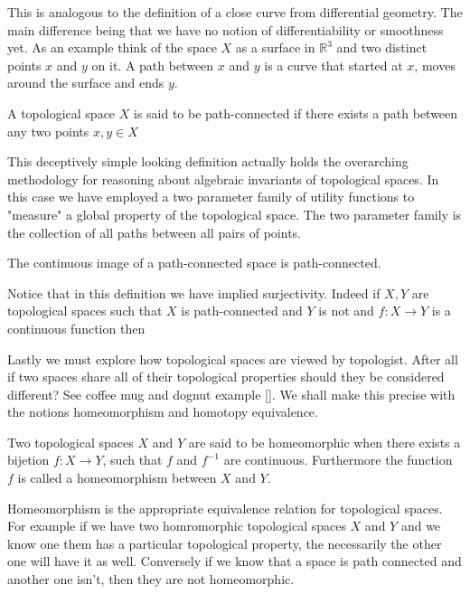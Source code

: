     This is analogous to the definition of a close curve from differential geometry. The main difference being that we have no notion of differentiability or smoothness yet. As an example think of the space $X$ as a surface in $\mathbb{R}^3$ and two distinct points $x$ and $y$ on it. A path between $x$ and $y$ is a curve that started at $x$, moves around the surface and ends $y$.

\begin{defn} A topological space $X$ is said to be path-connected if there exists a path between any two points $x, y \in X$  \end{defn}


This deceptively simple looking definition actually holds the overarching methodology for reasoning about algebraic invariants of topological spaces. In this case we have employed a two parameter family of utility functions to "measure" a global property of the topological space. The two parameter family is the collection of all paths between all pairs of points.

\begin{prop} The continuous image of a path-connected space is path-connected. \end{prop}

Notice that in this definition we have implied surjectivity. Indeed if $X, Y$ are topological spaces such that $X$ is path-connected and $Y$ is not and $f : X \to Y$ is a continuous function then 

Lastly we must explore how topological spaces are viewed by topologist. After all if two spaces share all of their topological properties should they be considered different? See coffee mug and dognut example []. We shall make this precise with the notions homeomorphism and homotopy equivalence.

\begin{defn} Two topological spaces $X$ and $Y$ are said to be homeomorphic when there exists a bijetion $f : X \to Y$, such that $f$ and $f^{-1}$ are continuous. Furthermore the function $f$ is called a homeomorphism between $X$ and $Y$.  \end{defn}

Homeomorphism is the appropriate equivalence relation for topological spaces. For example if we have two homromorphic topological spaces $X$ and $Y$ and we know one them has a particular topological property, the necessarily the other one will have it as well. Conversely if we know that a space is path connected and another one isn't, then they are not homeomorphic.

